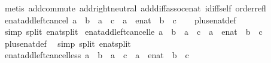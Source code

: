 \begin{isabellebody}
%
\isadelimproof
%
\endisadelimproof
%
\isatagproof
{}\isamarkupfalse%
\ {\isacharparenleft}metis\ add{\isachardot}commute\ add{\isachardot}right{\isacharunderscore}neutral\ add{\isacharunderscore}diff{\isacharunderscore}assoc{\isacharunderscore}enat\ idiff{\isacharunderscore}self\ order{\isacharunderscore}refl{\isacharparenright}%
\endisatagproof
{\isafoldproof}%
%
\isadelimproof
\isanewline
%
\endisadelimproof
\isanewline
{}\isamarkupfalse%
\ enat{\isacharunderscore}add{\isacharunderscore}left{\isacharunderscore}cancel{\isacharcolon}\ {\isachardoublequoteopen}a\ {\isacharplus}\ b\ {\isacharequal}\ a\ {\isacharplus}\ c\ {\isasymlongleftrightarrow}\ a\ {\isacharequal}\ {\isacharparenleft}{\isasyminfinity}{\isacharcolon}{\isacharcolon}enat{\isacharparenright}\ {\isasymor}\ b\ {\isacharequal}\ c{\isachardoublequoteclose}\isanewline
%
\isadelimproof
\ \ %
\endisadelimproof
%
\isatagproof
{}\isamarkupfalse%
\ plus{\isacharunderscore}enat{\isacharunderscore}def\ \isamarkupfalse%
\ {\isacharparenleft}simp\ split{\isacharcolon}\ enat{\isachardot}split{\isacharparenright}%
\endisatagproof
{\isafoldproof}%
%
\isadelimproof
\isanewline
%
\endisadelimproof
\isanewline
{}\isamarkupfalse%
\ enat{\isacharunderscore}add{\isacharunderscore}left{\isacharunderscore}cancel{\isacharunderscore}le{\isacharcolon}\ {\isachardoublequoteopen}a\ {\isacharplus}\ b\ {\isasymle}\ a\ {\isacharplus}\ c\ {\isasymlongleftrightarrow}\ a\ {\isacharequal}\ {\isacharparenleft}{\isasyminfinity}{\isacharcolon}{\isacharcolon}enat{\isacharparenright}\ {\isasymor}\ b\ {\isasymle}\ c{\isachardoublequoteclose}\isanewline
%
\isadelimproof
\ \ %
\endisadelimproof
%
\isatagproof
{}\isamarkupfalse%
\ plus{\isacharunderscore}enat{\isacharunderscore}def\ \isamarkupfalse%
\ {\isacharparenleft}simp\ split{\isacharcolon}\ enat{\isachardot}split{\isacharparenright}%
\endisatagproof
{\isafoldproof}%
%
\isadelimproof
\isanewline
%
\endisadelimproof
\isanewline
{}\isamarkupfalse%
\ enat{\isacharunderscore}add{\isacharunderscore}left{\isacharunderscore}cancel{\isacharunderscore}less{\isacharcolon}\ {\isachardoublequoteopen}a\ {\isacharplus}\ b\ {\isacharless}\ a\ {\isacharplus}\ c\ {\isasymlongleftrightarrow}\ a\ {\isasymnoteq}\ {\isacharparenleft}{\isasyminfinity}{\isacharcolon}{\isacharcolon}enat{\isacharparenright}\ {\isasymand}\ b\ {\isacharless}\ c{\isachardoublequoteclose}\isanewline
%
\isadelimproof
\ \ %
\endisadelimproof
%
\isatagproof
{}\isamarkupfalse%

\end{isabellebody}
